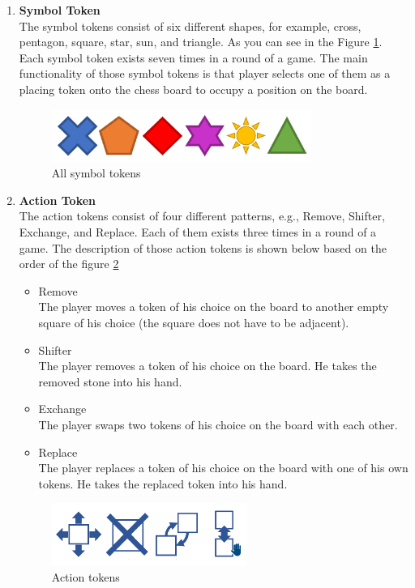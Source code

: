 \begin{enumerate}
	\item\textbf{Symbol Token }\\
    The symbol tokens consist of six different shapes, for example, cross, pentagon, square, star, sun, and triangle. As you can see in the Figure \ref{fig:symbol tokens}. Each symbol token exists seven times in a round of a game. The main functionality of those symbol tokens is that player selects one of them as a placing token onto the chess board to occupy a position on the board. 
	
	\begin{figure}[h]
		\centering
		\includegraphics[width=0.8\textwidth]{image/Symbol tokens}
		\caption{All symbol tokens}
		\label{fig:symbol tokens}
	\end{figure}
	
	\item\textbf{Action Token }\\
	The action tokens consist of four different patterns, e.g., Remove, Shifter, Exchange, and Replace.
	Each of them exists three times in a round of a game. The description of those action tokens is shown below based on the order of the figure \ref{fig:action tokens}
	\begin{itemize}
		\item {Remove}\\
		The player moves a token of his choice on the board to another empty square of his choice (the square does not have to be adjacent).
		
		\item {Shifter}\\
		The player removes a token of his choice on the board. He takes the removed stone into his hand.
		
		\item {Exchange}\\
		The player swaps two tokens of his choice on the board with each other.
		
		\item {Replace}\\
		The player replaces a token of his choice on the board with one of his own tokens. He takes the replaced token into his hand.
		
	\end{itemize}
	
	\begin{figure}[h]
		\centering
		\includegraphics[width=0.6\textwidth]{image/Action tokens}
		\caption{Action tokens}
		\label{fig:action tokens}
	\end{figure}
	
\end{enumerate}

